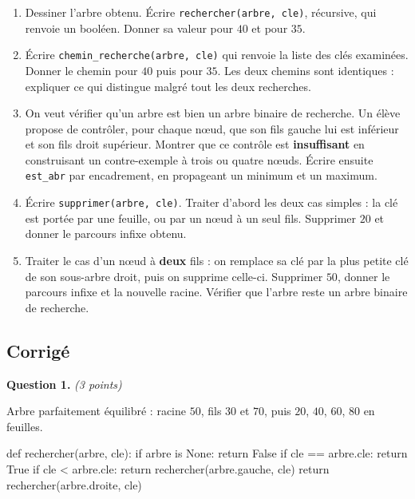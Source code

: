 \begin{enumerate}
  \item Dessiner l'arbre obtenu. Écrire \lstinline{rechercher(arbre, cle)},
    récursive, qui renvoie un booléen. Donner sa valeur pour $40$ et pour $35$.

  \item Écrire \lstinline{chemin_recherche(arbre, cle)} qui renvoie la liste des
    clés examinées. Donner le chemin pour $40$ puis pour $35$. Les deux chemins
    sont identiques : expliquer ce qui distingue malgré tout les deux
    recherches.

  \item On veut vérifier qu'un arbre est bien un arbre binaire de recherche. Un
    élève propose de contrôler, pour chaque nœud, que son fils gauche lui est
    inférieur et son fils droit supérieur. Montrer que ce contrôle est
    \textbf{insuffisant} en construisant un contre-exemple à trois ou quatre
    nœuds. Écrire ensuite \lstinline{est_abr} par encadrement, en propageant un
    minimum et un maximum.

  \item Écrire \lstinline{supprimer(arbre, cle)}. Traiter d'abord les deux cas
    simples : la clé est portée par une feuille, ou par un nœud à un seul fils.
    Supprimer $20$ et donner le parcours infixe obtenu.

  \item Traiter le cas d'un nœud à \textbf{deux} fils : on remplace sa clé par
    la plus petite clé de son sous-arbre droit, puis on supprime celle-ci.
    Supprimer $50$, donner le parcours infixe et la nouvelle racine. Vérifier
    que l'arbre reste un arbre binaire de recherche.
\end{enumerate}

\subsection*{Corrigé}

\textbf{Question 1.} \emph{(3 points)}

Arbre parfaitement équilibré : racine $50$, fils $30$ et $70$, puis $20$, $40$,
$60$, $80$ en feuilles.

\begin{python}
def rechercher(arbre, cle):
    if arbre is None:
        return False
    if cle == arbre.cle:
        return True
    if cle < arbre.cle:
        return rechercher(arbre.gauche, cle)
    return rechercher(arbre.droite, cle)
\end{python}

